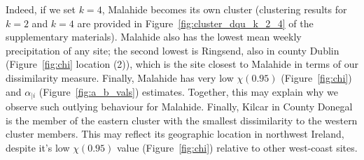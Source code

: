 \documentclass[12pt,compact]{article}
\begin{document}
Indeed, if we set $k=4$, Malahide becomes its own cluster (clustering results for $k=2$ and $k=4$ are provided in Figure~\ref{fig:cluster_dqu_k_2_4} of the supplementary materials).
Malahide also has the lowest mean weekly precipitation of any site; the second lowest is Ringsend, also in county Dublin (Figure~\ref{fig:chi} location (2)), which is the site closest to Malahide in terms of our dissimilarity measure. 
Finally, Malahide has very low $\chi(0.95)$ (Figure~\ref{fig:chi}) and $\alpha_{\mid i}$ (Figure~\ref{fig:a_b_vals}) estimates. 
Together, this may explain why we observe such outlying behaviour for Malahide.
Finally, Kilcar in County Donegal is the member of the eastern cluster with the smallest dissimilarity to the western cluster members.
This may reflect its geographic location in northwest Ireland, despite it's low $\chi(0.95)$ value (Figure~\ref{fig:chi}) relative to other west-coast sites.
\end{document}
